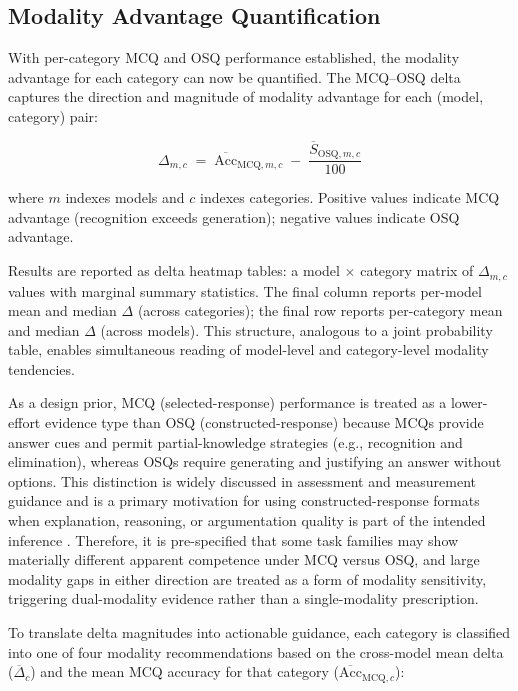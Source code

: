 \subsection{Modality Advantage Quantification}
\label{subsec:ch3_obj7_delta}

With per-category MCQ and OSQ performance established, the modality advantage for each category can now be quantified. The MCQ--OSQ delta captures the direction and magnitude of modality advantage for each (model, category) pair:

\[
\Delta_{m,c} \;=\; \overline{\text{Acc}}_{\text{MCQ},m,c} \;-\; \frac{\overline{S}_{\text{OSQ},m,c}}{100}
\]

where $m$ indexes models and $c$ indexes categories. Positive values indicate MCQ advantage (recognition exceeds generation); negative values indicate OSQ advantage.

Results are reported as delta heatmap tables: a model $\times$ category matrix of $\Delta_{m,c}$ values with marginal summary statistics. The final column reports per-model mean and median $\Delta$ (across categories); the final row reports per-category mean and median $\Delta$ (across models). This structure, analogous to a joint probability table, enables simultaneous reading of model-level and category-level modality tendencies.

As a design prior, MCQ (selected-response) performance is treated as a lower-effort evidence type than OSQ (constructed-response) because MCQs provide answer cues and permit partial-knowledge strategies (e.g., recognition and elimination), whereas OSQs require generating and justifying an answer without options. This distinction is widely discussed in assessment and measurement guidance and is a primary motivation for using constructed-response formats when explanation, reasoning, or argumentation quality is part of the intended inference \cite{livingston_ConstructedResponseTestQuestionsWhy_2009, AmEdAssoc_StandardsForEducationalTesting_2014}. Therefore, it is pre-specified that some task families may show materially different apparent competence under MCQ versus OSQ, and large modality gaps in either direction are treated as a form of modality sensitivity, triggering dual-modality evidence rather than a single-modality prescription.

To translate delta magnitudes into actionable guidance, each category is classified into one of four modality recommendations based on the cross-model mean delta ($\overline{\Delta}_c$) and the mean MCQ accuracy for that category ($\overline{\text{Acc}}_{\text{MCQ},c}$):

